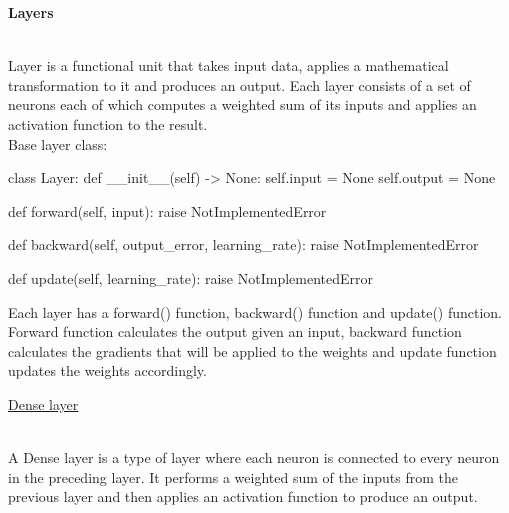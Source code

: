 \documentclass{article}
\begin{document}
    \hypertarget{layers}{\textbf{Layers}} \\

    Layer is a functional unit that takes input data, applies a 
    mathematical transformation to it and produces an output. Each layer 
    consists of a set of neurons each of which computes a weighted sum of 
    its inputs and applies an activation function to the result. \\

    Base layer class:
    \begin{python}
class Layer:
    def __init__(self) -> None:
        self.input = None
        self.output = None

    def forward(self, input):
        raise NotImplementedError

    def backward(self, output_error, learning_rate):
        raise NotImplementedError

    def update(self, learning_rate):
        raise NotImplementedError
    \end{python}
    Each layer has a forward() function, backward() function and update() function. Forward function
    calculates the output given an input, backward function calculates the gradients that will be applied to 
    the weights and update function updates the weights accordingly.
    \pagebreak

    \hypertarget{dense_layer}{\underline{Dense layer}} \\

    A Dense layer is a type of layer where each neuron is connected to every neuron 
    in the preceding layer. It performs a weighted sum of the inputs from the previous
    layer and then applies an activation function to produce an output. \\
\end{document}
